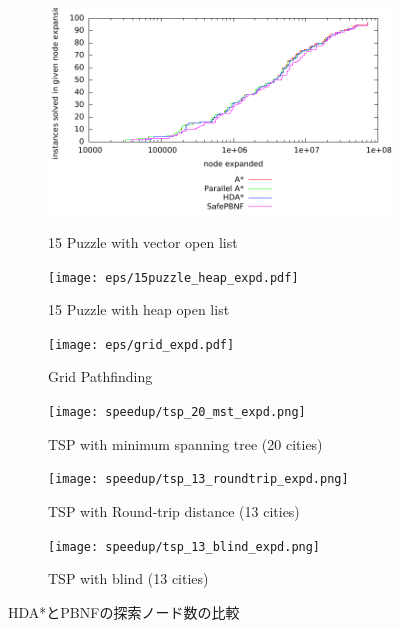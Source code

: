 \documentclass{jsarticle}
\begin{document}
\begin{figure}
	\centering
	\begin{subfigure}{0.4\columnwidth}
		\includegraphics[width=\columnwidth]{eps/15puzzle_vector_expd.pdf}
		\label{fig:15puzzle_vector}
		\caption{15 Puzzle with vector open list}
	\end{subfigure}

	\begin{subfigure}{0.4\columnwidth}
		\texttt{[image: eps/15puzzle\_heap\_expd.pdf]}
		\label{fig:15puzzle_vector}
		\caption{15 Puzzle with heap open list}
	\end{subfigure}

	\begin{subfigure}{0.4\columnwidth}
		\texttt{[image: eps/grid\_expd.pdf]}
		\label{fig:grid}
		\caption{Grid Pathfinding}
	\end{subfigure}

	\begin{subfigure}{0.4\columnwidth}
		\texttt{[image: speedup/tsp\_20\_mst\_expd.png]}
		\label{fig:tsp_20_mst}
		\caption{TSP with minimum spanning tree (20 cities)}
	\end{subfigure}

	\begin{subfigure}{0.4\columnwidth}
		\texttt{[image: speedup/tsp\_13\_roundtrip\_expd.png]}
		\label{fig:tsp_13_round}
		\caption{TSP with Round-trip distance (13 cities)}
	\end{subfigure}

	\begin{subfigure}{0.4\columnwidth}
		\texttt{[image: speedup/tsp\_13\_blind\_expd.png]}
		\label{fig:tsp_13_blind}
		\caption{TSP with blind (13 cities)}
	\end{subfigure}
	\label{fig:comparison}
	\caption{HDA*とPBNFの探索ノード数の比較}
\end{figure}%
\end{document}
